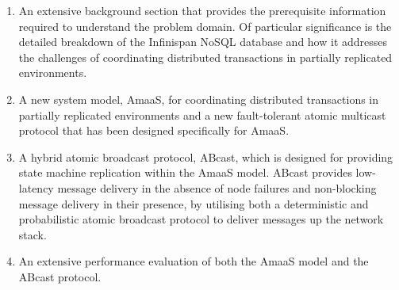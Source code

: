 	    \begin{enumerate}[label=\roman*]
	        \item An extensive background section that provides the prerequisite information required to understand the problem domain.  Of particular significance is the detailed breakdown of the Infinispan NoSQL database and how it addresses the challenges of coordinating distributed transactions in partially replicated environments.  
	        
	        \item A new system model, \textsf{AmaaS}, for coordinating distributed transactions in partially replicated environments and a new fault-tolerant atomic multicast protocol that has been designed specifically for \textsf{AmaaS}.  
	        
	        \item A hybrid atomic broadcast protocol, \textsf{ABcast}, which is designed for providing state machine replication within the \textsf{AmaaS} model.  \textsf{ABcast} provides low-latency message delivery in the absence of node failures and non-blocking message delivery in their presence, by utilising both a deterministic and probabilistic atomic broadcast protocol to deliver messages up the network stack.  
	        
	        \item An extensive performance evaluation of both the \textsf{AmaaS} model and the \textsf{ABcast} protocol.
	    \end{enumerate}
    
